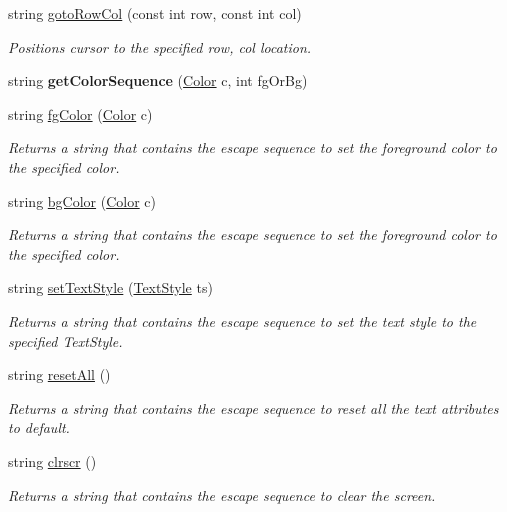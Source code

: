 \begin{DoxyCompactItemize}
\item 
string \hyperlink{namespaceconio_a1a3ebea2e6495877a9ee71144c75753e}{goto\+Row\+Col} (const int row, const int col)
\begin{DoxyCompactList}\small\item\em Positions cursor to the specified row, col location. \end{DoxyCompactList}\item 
string {\bfseries get\+Color\+Sequence} (\hyperlink{namespaceconio_a5580b879f58716cb8abe8eb7ecb789eb}{Color} c, int fg\+Or\+Bg)\hypertarget{namespaceconio_a748465c534fed2f1d38b09ebd09b146c}{}\label{namespaceconio_a748465c534fed2f1d38b09ebd09b146c}

\item 
string \hyperlink{namespaceconio_aa0e5fc54c0f3db19c1201e4a322d449c}{fg\+Color} (\hyperlink{namespaceconio_a5580b879f58716cb8abe8eb7ecb789eb}{Color} c)
\begin{DoxyCompactList}\small\item\em Returns a string that contains the escape sequence to set the foreground color to the specified color. \end{DoxyCompactList}\item 
string \hyperlink{namespaceconio_a2a5d9994e199d91db69d7274e091d71a}{bg\+Color} (\hyperlink{namespaceconio_a5580b879f58716cb8abe8eb7ecb789eb}{Color} c)
\begin{DoxyCompactList}\small\item\em Returns a string that contains the escape sequence to set the foreground color to the specified color. \end{DoxyCompactList}\item 
string \hyperlink{namespaceconio_a5ad1fe72a9301d2206e56cc517b01a32}{set\+Text\+Style} (\hyperlink{namespaceconio_a4c720b3477d66baeb5a8c8c60b9d2002}{Text\+Style} ts)
\begin{DoxyCompactList}\small\item\em Returns a string that contains the escape sequence to set the text style to the specified Text\+Style. \end{DoxyCompactList}\item 
string \hyperlink{namespaceconio_a0f86b2fbc565f5e6831e75216cf3e708}{reset\+All} ()
\begin{DoxyCompactList}\small\item\em Returns a string that contains the escape sequence to reset all the text attributes to default. \end{DoxyCompactList}\item 
string \hyperlink{namespaceconio_afc18f30814e14ce8c5bcd15a60aae173}{clrscr} ()
\begin{DoxyCompactList}\small\item\em Returns a string that contains the escape sequence to clear the screen. \end{DoxyCompactList}\end{DoxyCompactItemize}
